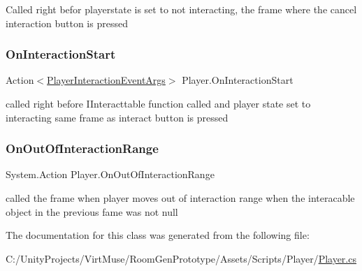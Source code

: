 Called right befor playerstate is set to not interacting, the frame where the cancel interaction button is pressed 

\mbox{\label{class_player_a22eae36e514445cac4172890ed186638}} 
\subsubsection{\texorpdfstring{On\+Interaction\+Start}{OnInteractionStart}}
{\footnotesize\ttfamily Action$<$\mbox{\hyperlink{class_player_interaction_event_args}{Player\+Interaction\+Event\+Args}}$>$ Player.\+On\+Interaction\+Start}



called right before I\+Interacttable function called and player state set to interacting same frame as interact button is pressed 

\mbox{\label{class_player_a319e807c138700dc247ebbba9579899e}} 
\subsubsection{\texorpdfstring{On\+Out\+Of\+Interaction\+Range}{OnOutOfInteractionRange}}
{\footnotesize\ttfamily System.\+Action Player.\+On\+Out\+Of\+Interaction\+Range}





called the frame when player moves out of interaction range when the interacable object in the previous fame was not null 

The documentation for this class was generated from the following file\+:\begin{DoxyCompactItemize}
\item 
C\+:/\+Unity\+Projects/\+Virt\+Muse/\+Room\+Gen\+Prototype/\+Assets/\+Scripts/\+Player/\mbox{\hyperlink{_player_8cs}{Player.\+cs}}\end{DoxyCompactItemize}

